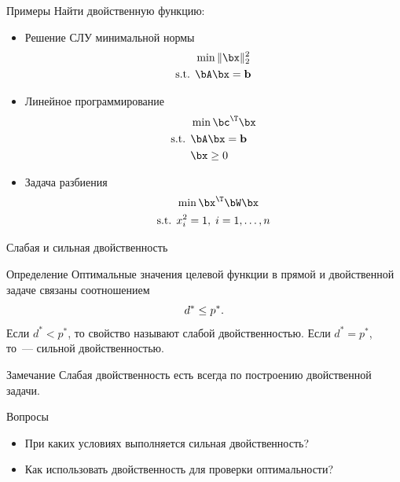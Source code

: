 \documentclass[12pt,russian]{beamer}
\begin{document}
\begin{frame}{Примеры}
Найти двойственную функцию:
\begin{itemize}
\item Решение СЛУ минимальной нормы 
\vspace{-3mm}
\begin{equation*}
\begin{split}
& \min \| \bx\|^2_2\\
\text{s.t. } & \bA\bx = \mathbf{b}
\end{split}
\end{equation*}
\item Линейное программирование
\vspace{-3mm}
\begin{equation*}
\begin{split}
& \min \bc^{\T}\bx\\
\text{s.t. } & \bA\bx = \mathbf{b}\\
& \bx \geq 0
\end{split}
\end{equation*}
\item Задача разбиения
\vspace{-3mm}
\begin{equation*}
\begin{split}
& \min \bx^{\T}\bW\bx\\
\text{s.t. } & x^2_i = 1, \; i = 1,\ldots,n
\end{split}
\end{equation*}
\end{itemize}
\end{frame}

\begin{frame}{Слабая и сильная двойственность}
\small
\begin{block}{Определение}
Оптимальные значения целевой функции в прямой и двойственной задаче связаны соотношением 
\vspace{-3mm}
\[
d^* \leq p^*.
\vspace{-4mm}
\]
Если $d^* < p^*$, то свойство называют слабой двойственностью.
Если $d^* = p^*$, то~--- сильной двойственностью.
\end{block}

\begin{block}{Замечание}
Слабая двойственность есть всегда по построению двойственной задачи.
\end{block}

\begin{block}{Вопросы}
\begin{itemize}
\item При каких условиях выполняется сильная двойственность?
\vspace{-7mm}
\item Как использовать двойственность для проверки оптимальности?
\end{itemize}
\end{block}
\end{frame}
\end{document}
